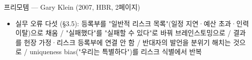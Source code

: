 \begin{frame}[allowframebreaks=1.0]{프리모템 — Gary Klein (2007, HBR, 2페이지)}
\begin{itemize}
\item\relax 실무 오류 다섯 (§3.5): 등록부를 "일반적 리스크 목록"(일정 지연·예산 초과·인력 이탈)으로 채움 / "실패했다"를 "실패할 수 있다"로 바꿔 브레인스토밍으로 / 결과를 헌장 가정·리스크 등록부에 연결 안 함 / 반대자의 발언을 분위기 해치는 것으로 / uniqueness bias("우리는 특별하다")를 리스크 식별에서 반복
\end{itemize}
\end{frame}

